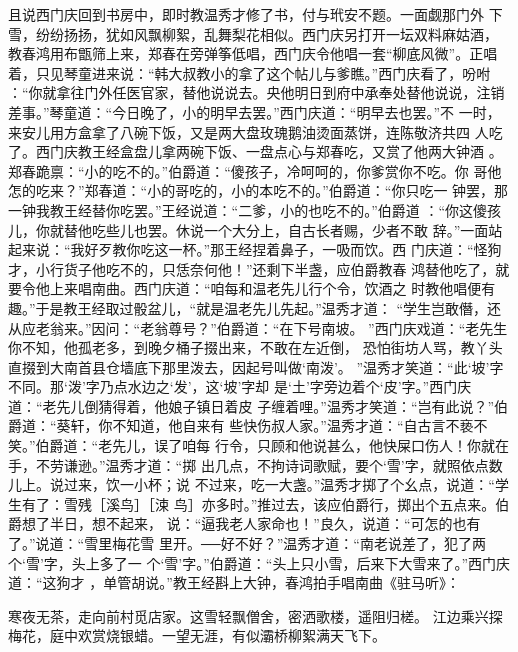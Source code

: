 且说西门庆回到书房中，即时教温秀才修了书，付与玳安不题。一面觑那门外
下雪，纷纷扬扬，犹如风飘柳絮，乱舞梨花相似。西门庆另打开一坛双料麻姑酒，
教春鸿用布甑筛上来，郑春在旁弹筝低唱，西门庆令他唱一套“柳底风微”。正唱
着，只见琴童进来说：“韩大叔教小的拿了这个帖儿与爹瞧。”西门庆看了，吩咐
：“你就拿往门外任医官家，替他说说去。央他明日到府中承奉处替他说说，注销
差事。”琴童道：“今日晚了，小的明早去罢。”西门庆道：“明早去也罢。”不
一时，来安儿用方盒拿了八碗下饭，又是两大盘玫瑰鹅油烫面蒸饼，连陈敬济共四
人吃了。西门庆教王经盒盘儿拿两碗下饭、一盘点心与郑春吃，又赏了他两大钟酒
。郑春跪禀：“小的吃不的。”伯爵道：“傻孩子，冷呵呵的，你爹赏你不吃。你
哥他怎的吃来？”郑春道：“小的哥吃的，小的本吃不的。”伯爵道：“你只吃一
钟罢，那一钟我教王经替你吃罢。”王经说道：“二爹，小的也吃不的。”伯爵道
：“你这傻孩儿，你就替他吃些儿也罢。休说一个大分上，自古长者赐，少者不敢
辞。”一面站起来说：“我好歹教你吃这一杯。”那王经捏着鼻子，一吸而饮。西
门庆道：“怪狗才，小行货子他吃不的，只恁奈何他！”还剩下半盏，应伯爵教春
鸿替他吃了，就要令他上来唱南曲。西门庆道：“咱每和温老先儿行个令，饮酒之
时教他唱便有趣。”于是教王经取过骰盆儿，“就是温老先儿先起。”温秀才道：
“学生岂敢僭，还从应老翁来。”因问：“老翁尊号？”伯爵道：“在下号南坡。
”西门庆戏道：“老先生你不知，他孤老多，到晚夕桶子掇出来，不敢在左近倒，
恐怕街坊人骂，教丫头直掇到大南首县仓墙底下那里泼去，因起号叫做‘南泼’。
”温秀才笑道：“此‘坡’字不同。那‘泼’字乃点水边之‘发’，这‘坡’字却
是‘土’字旁边着个‘皮’字。”西门庆道：“老先儿倒猜得着，他娘子镇日着皮
子缠着哩。”温秀才笑道：“岂有此说？”伯爵道：“葵轩，你不知道，他自来有
些快伤叔人家。”温秀才道：“自古言不亵不笑。”伯爵道：“老先儿，误了咱每
行令，只顾和他说甚么，他快屎口伤人！你就在手，不劳谦逊。”温秀才道：“掷
出几点，不拘诗词歌赋，要个‘雪’字，就照依点数儿上。说过来，饮一小杯；说
不过来，吃一大盏。”温秀才掷了个幺点，说道：“学生有了：雪残［溪鸟］［涑
鸟］亦多时。”推过去，该应伯爵行，掷出个五点来。伯爵想了半日，想不起来，
说：“逼我老人家命也！”良久，说道：“可怎的也有了。”说道：“雪里梅花雪
里开。──好不好？”温秀才道：“南老说差了，犯了两个‘雪’字，头上多了一
个‘雪’字。”伯爵道：“头上只小雪，后来下大雪来了。”西门庆道：“这狗才
，单管胡说。”教王经斟上大钟，春鸿拍手唱南曲《驻马听》：

寒夜无茶，走向前村觅店家。这雪轻飘僧舍，密洒歌楼，遥阻归槎。
江边乘兴探梅花，庭中欢赏烧银蜡。一望无涯，有似灞桥柳絮满天飞下。

